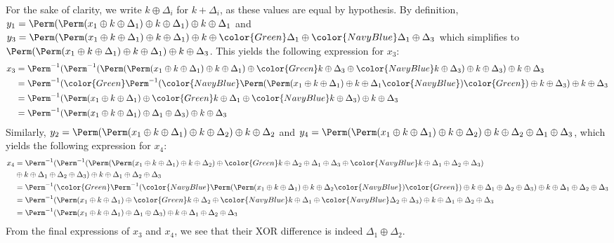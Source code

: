 For the sake of clarity, we write $k \oplus \Delta_i$ for $k + \Delta_i$, as these values are equal by hypothesis. 
By definition,
$y_1 = \Perm(\Perm(x_1 \oplus k \oplus \Delta_1) \oplus k \oplus \Delta_1) \oplus k \oplus \Delta_1$ and
$y_3 = \Perm(\Perm(x_1 \oplus k \oplus \Delta_1) \oplus k \oplus \Delta_1) \oplus k \oplus {\color{Green}\Delta_1} \oplus {\color{NavyBlue}\Delta_1} \oplus \Delta_3$
which simplifies to 
$\Perm(\Perm(x_1 \oplus k \oplus \Delta_1) \oplus k \oplus \Delta_1) \oplus k \oplus \Delta_3$. This yields the following
expression for $x_3$:
\begin{align*}
x_3 &= \Perm^{-1}(\Perm^{-1}(\Perm(\Perm(x_1 \oplus k \oplus \Delta_1) \oplus k \oplus \Delta_1) \oplus {\color{Green}k \oplus \Delta_3} \oplus {\color{NavyBlue}k \oplus \Delta_3})
\oplus k \oplus \Delta_3) \oplus k \oplus \Delta_3 \\
&= \Perm^{-1}({\color{Green}\Perm^{-1}(}{\color{NavyBlue}\Perm(}\Perm(x_1 \oplus k \oplus \Delta_1) \oplus k \oplus \Delta_1{\color{NavyBlue})}{\color{Green})}
\oplus k \oplus \Delta_3) \oplus k \oplus \Delta_3 \\
&= \Perm^{-1}(\Perm(x_1 \oplus k \oplus \Delta_1) \oplus {\color{Green}k} \oplus \Delta_1 \oplus {\color{NavyBlue}k} \oplus \Delta_3) \oplus k \oplus \Delta_3 \\
&= \Perm^{-1}(\Perm(x_1 \oplus k \oplus \Delta_1) \oplus \Delta_1 \oplus \Delta_3) \oplus k \oplus \Delta_3
\end{align*}
Similarly,
$y_2 = \Perm(\Perm(x_1 \oplus k \oplus \Delta_1) \oplus k \oplus \Delta_2) \oplus k \oplus \Delta_2$ and
$y_4 = \Perm(\Perm(x_1 \oplus k \oplus \Delta_1) \oplus k \oplus \Delta_2) \oplus k \oplus \Delta_2 \oplus \Delta_1 \oplus \Delta_3$, which
yields the following expression for $x_4$:
\begin{align*}
x_4 &=  \Perm^{-1}(\Perm^{-1}(\Perm(\Perm(x_1 \oplus k \oplus \Delta_1) \oplus k \oplus \Delta_2) \oplus {\color{Green}k \oplus \Delta_2 \oplus \Delta_1
\oplus \Delta_3} \oplus {\color{NavyBlue}k \oplus \Delta_1 \oplus \Delta_2 \oplus \Delta_3}) \\
&\oplus k \oplus \Delta_1 \oplus \Delta_2 \oplus \Delta_3) \oplus k \oplus \Delta_1 \oplus \Delta_2 \oplus \Delta_3\\
&= \Perm^{-1}({\color{Green}\Perm^{-1}(}{\color{NavyBlue}\Perm(}\Perm(x_1 \oplus k \oplus \Delta_1) \oplus k \oplus \Delta_2{\color{NavyBlue})}{\color{Green})}
\oplus k \oplus \Delta_1 \oplus \Delta_2
\oplus \Delta_3) \oplus k \oplus \Delta_1 \oplus \Delta_2 \oplus \Delta_3 \\
&= \Perm^{-1}(\Perm(x_1 \oplus k \oplus \Delta_1) \oplus {\color{Green}k \oplus \Delta_2} \oplus {\color{NavyBlue}k} \oplus \Delta_1 \oplus {\color{NavyBlue}\Delta_2} \oplus
\Delta_3) \oplus k \oplus \Delta_1 \oplus \Delta_2 \oplus \Delta_3\\
&= \Perm^{-1}(\Perm(x_1 \oplus k \oplus \Delta_1) \oplus \Delta_1 \oplus \Delta_3) \oplus k \oplus \Delta_1 \oplus \Delta_2 \oplus \Delta_3
\end{align*}
From the final expressions of $x_3$ and $x_4$, we see that their XOR difference is indeed $\Delta_1 \oplus \Delta_2$.

